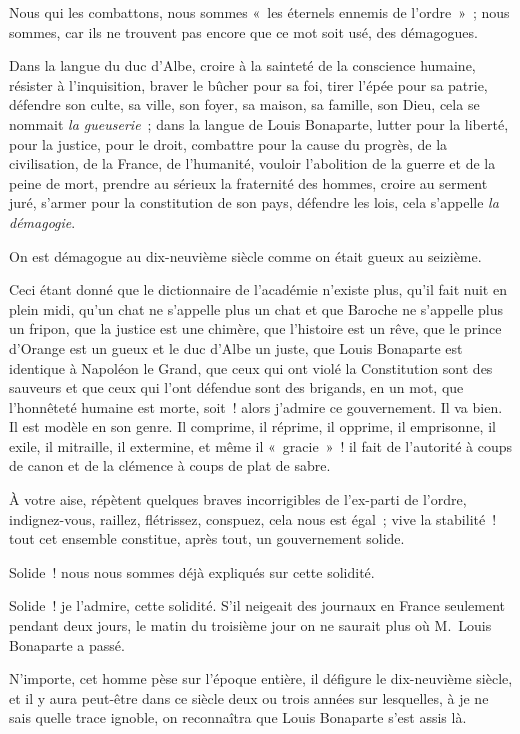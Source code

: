 \documentclass[french,twoside]{book} %
\begin{document}
Nous qui les combattons, nous sommes « les éternels ennemis de l’ordre » ; nous sommes, car ils ne trouvent pas encore que ce mot soit usé, des démagogues.\par
Dans la langue du duc d’Albe, croire à la sainteté de la conscience humaine, résister à l’inquisition, braver le bûcher pour sa foi, tirer l’épée pour sa patrie, défendre son culte, sa ville, son foyer, sa maison, sa famille, son Dieu, cela se nommait \emph{la gueuserie} ; dans la langue de Louis Bonaparte, lutter pour la liberté, pour la justice, pour le droit, combattre pour la cause du progrès, de la civilisation, de la France, de l’humanité, vouloir l’abolition de la guerre et de la peine de mort, prendre au sérieux la fraternité des hommes, croire au serment juré, s’armer pour la constitution de son pays, défendre les lois, cela s’appelle \emph{la démagogie}.\par
On est démagogue au dix-neuvième siècle comme on était gueux au seizième.\par
Ceci étant donné que le dictionnaire de l’académie n’existe plus, qu’il fait nuit en plein midi, qu’un chat ne s’appelle plus un chat et que Baroche ne s’appelle plus un fripon, que la justice est une chimère, que l’histoire est un rêve, que le prince d’Orange est un gueux et le duc d’Albe un juste, que Louis Bonaparte est identique à Napoléon le Grand, que ceux qui ont violé la Constitution sont des sauveurs et que ceux qui l’ont défendue sont des brigands, en un mot, que l’honnêteté humaine est morte, soit ! alors j’admire ce gouvernement. Il va bien. Il est modèle en son genre. Il comprime, il réprime, il opprime, il emprisonne, il exile, il mitraille, il extermine, et même il « gracie » ! il fait de l’autorité à coups de canon et de la clémence à coups de plat de sabre.\par
À votre aise, répètent quelques braves incorrigibles de l’ex-parti de l’ordre, indignez-vous, raillez, flétrissez, conspuez, cela nous est égal ; vive la stabilité ! tout cet ensemble constitue, après tout, un gouvernement solide.\par
Solide ! nous nous sommes déjà expliqués sur cette solidité.\par
Solide ! je l’admire, cette solidité. S’il neigeait des journaux en France seulement pendant deux jours, le matin du troisième jour on ne saurait plus où M. Louis Bonaparte a passé.\par
N’importe, cet homme pèse sur l’époque entière, il défigure le dix-neuvième siècle, et il y aura peut-être dans ce siècle deux ou trois années sur lesquelles, à je ne sais quelle trace ignoble, on reconnaîtra que Louis Bonaparte s’est assis là.\par
\end{document}
